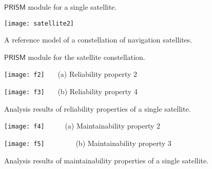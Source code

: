 \documentclass[preprint,12pt]{qrei}
\begin{document}
\begin{figure}[ht]
\begin{center}
\setlength{\fboxrule}{0.5pt} 
\setlength{\fboxsep}{0.25cm} 
\caption{$\mathsf{PRISM}$ module for a single satellite.}
\label{fig:code1}
\end{center}
\end{figure}

\begin{figure*}[ht]
\centerline{\texttt{[image: satellite2]}}
\caption{A reference model of a constellation of navigation satellites.}
\label{fig:model2}
\end{figure*}

\begin{figure}[ht]
\begin{center}
\setlength{\fboxrule}{0.5pt} 
\setlength{\fboxsep}{0.25cm} 
\caption{$\mathsf{PRISM}$ module for the satellite constellation.}
\label{fig:code2}
\end{center}
\end{figure}

\begin{figure*}[ht]
\begin{minipage}[htbp]{0.5\linewidth}
\centering
\texttt{[image: f2]}
\footnotesize{\ \ \ (a) Reliability property 2}
\end{minipage}
\begin{minipage}[htbp]{0.5\linewidth}
\centering
\texttt{[image: f3]}
\footnotesize{\ \ \ (b) Reliability property 4}
\end{minipage}
\caption{Analysis results of reliability properties of a single satellite.}
\label{fig:one}
\end{figure*}

\begin{figure*}[ht]
\begin{minipage}[htbp]{0.5\linewidth}
\centering
\texttt{[image: f4]}
\footnotesize{\ \ \ \ \ (a) Maintainability property 2}
\end{minipage}
\begin{minipage}[htbp]{0.5\linewidth}
\centering
\texttt{[image: f5]}
\footnotesize{\ \ \ \ \ \ \ \ (b) Maintainability property 3}
\end{minipage}
\caption{Analysis results of maintainability properties of a single satellite.}
\label{fig:two}
\end{figure*}
\end{document}

